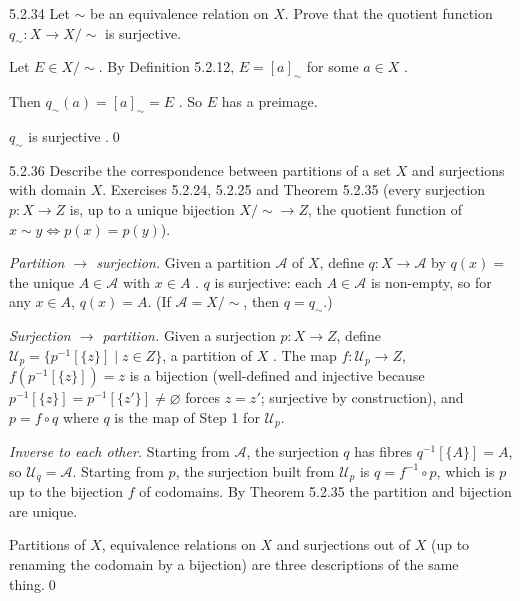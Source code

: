 \begin{bookex}[recommended]{5.2.34}
Let $\sim$ be an equivalence relation on $X$. Prove that the quotient function $q_\sim:X\to X/{\sim}$ is surjective.
\solution
\begin{steps}
\item Let $E\in X/{\sim}$. By Definition 5.2.12, $E=[a]_\sim$ for some $a\in X$ .
\item Then $q_\sim(a)=[a]_\sim=E$ . So $E$ has a preimage.
\end{steps}
\conclusion $q_\sim$ is surjective .\qed
\end{bookex}

\begin{bookex}[recommended]{5.2.36}
Describe the correspondence between partitions of a set $X$ and surjections with domain $X$.
\solution
\given Exercises 5.2.24, 5.2.25 and Theorem 5.2.35 (every surjection $p:X\to Z$ is, up to a unique bijection $X/{\sim}\to Z$, the quotient function of $x\sim y\Leftrightarrow p(x)=p(y)$).
\begin{steps}
\item \emph{Partition $\to$ surjection.} Given a partition $\mathcal A$ of $X$, define $q:X\to\mathcal A$ by $q(x)=$ the unique $A\in\mathcal A$ with $x\in A$ . $q$ is surjective: each $A\in\mathcal A$ is non-empty, so for any $x\in A$, $q(x)=A$. (If $\mathcal A=X/{\sim}$, then $q=q_\sim$.)
\item \emph{Surjection $\to$ partition.} Given a surjection $p:X\to Z$, define $\mathcal U_p=\{p^{-1}[\{z\}]\mid z\in Z\}$, a partition of $X$ . The map $f:\mathcal U_p\to Z$, $f(p^{-1}[\{z\}])=z$ is a bijection (well-defined and injective because $p^{-1}[\{z\}]=p^{-1}[\{z'\}]\ne\varnothing$ forces $z=z'$; surjective by construction), and $p=f\circ q$ where $q$ is the map of Step 1 for $\mathcal U_p$.
\item \emph{Inverse to each other.} Starting from $\mathcal A$, the surjection $q$ has fibres $q^{-1}[\{A\}]=A$, so $\mathcal U_q=\mathcal A$. Starting from $p$, the surjection built from $\mathcal U_p$ is $q=f^{-1}\circ p$, which is $p$ up to the bijection $f$ of codomains. By Theorem 5.2.35 the partition and bijection are unique.
\end{steps}
\conclusion Partitions of $X$, equivalence relations on $X$ and surjections out of $X$ (up to renaming the codomain by a bijection) are three descriptions of the same thing.\qed
\end{bookex}

